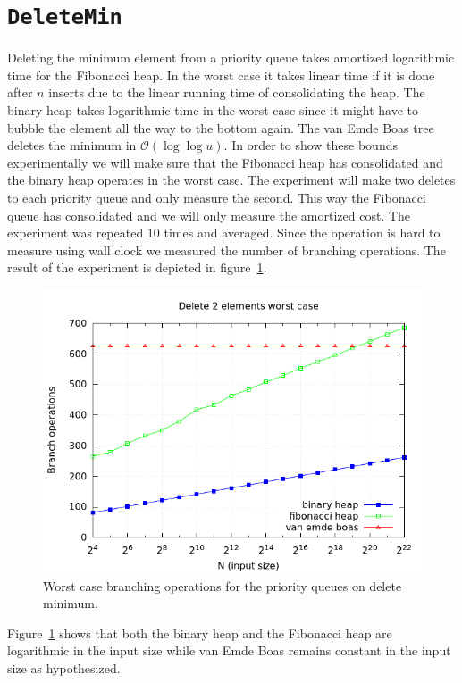 \documentclass[a4paper,oneside,article,11pt]{memoir}
\begin{document}
\section{\texttt{DeleteMin}}
Deleting the minimum element from a priority queue takes amortized logarithmic time for the Fibonacci heap. In the worst case it takes linear time if it is done after $n$ inserts due to the linear running time of consolidating the heap. The binary heap takes logarithmic time in the worst case since it might have to bubble the element all the way to the bottom again. The van Emde Boas tree deletes the minimum in $\mathcal{O}(\log\log u)$. In order to show these bounds experimentally we will make sure that the Fibonacci heap has consolidated and the binary heap operates in the worst case. The experiment will make two deletes to each priority queue and only measure the second. This way the Fibonacci queue has consolidated and we will only measure the amortized cost. The experiment was repeated 10 times and averaged. Since the operation is hard to measure using wall clock we measured the number of branching operations. The result of the experiment is depicted in figure~\ref{fig:insert_worst_branch}.

\begin{figure}[H]
\includegraphics[scale=0.5]{../res2/delmin/delmin_del_2_branch_worst.png}
\caption{Worst case branching operations for the priority queues on delete minimum.}
\label{fig:insert_worst_branch}
\end{figure}

Figure~\ref{fig:insert_worst_branch} shows that both the binary heap and the Fibonacci heap are logarithmic in the input size while van Emde Boas remains constant in the input size as hypothesized.
\end{document}
